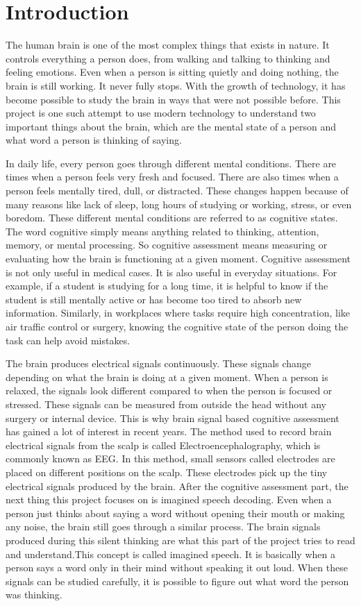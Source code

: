 \chapter{Introduction}
The human brain is one of the most complex things that exists in nature. It controls everything a person does, from walking and talking to thinking and feeling emotions. Even when a person is sitting quietly and doing nothing, the brain is still working. It never fully stops. With the growth of technology, it has become possible to study the brain in ways that were not possible before. This project is one such attempt to use modern technology to understand two important things about the brain, which are the mental state of a person and what word a person is thinking of saying.

In daily life, every person goes through different mental conditions. There are times when a person feels very fresh and focused. There are also times when a person feels mentally tired, dull, or distracted. These changes happen because of many reasons like lack of sleep, long hours of studying or working, stress, or even boredom. These different mental conditions are referred to as cognitive states. The word cognitive simply means anything related to thinking, attention, memory, or mental processing. So cognitive assessment means measuring or evaluating how the brain is functioning at a given moment. Cognitive assessment is not only useful in medical cases. It is also useful in everyday situations. For example, if a student is studying for a long time, it is helpful to know if the student is still mentally active or has become too tired to absorb new information. Similarly, in workplaces where tasks require high concentration, like air traffic control or surgery, knowing the cognitive state of the person doing the task can help avoid mistakes.

The brain produces electrical signals continuously. These signals change depending on what the brain is doing at a given moment. When a person is relaxed, the signals look different compared to when the person is focused or stressed. These signals can be measured from outside the head without any surgery or internal device. This is why brain signal based cognitive assessment has gained a lot of interest in recent years. The method used to record brain electrical signals from the scalp is called Electroencephalography, which is commonly known as EEG. In this method, small sensors called electrodes are placed on different positions on the scalp. These electrodes pick up the tiny electrical signals produced by the brain.
After the cognitive assessment part, the next thing this project focuses on is imagined speech decoding. Even when a person just thinks about saying a word without opening their mouth or making any noise, the brain still goes through a similar process. The brain signals produced during this silent thinking are what this part of the project tries to read and understand.This concept is called imagined speech. It is basically when a person says a word only in their mind without speaking it out loud. When these signals can be studied carefully, it is possible to figure out what word the person was thinking. 



